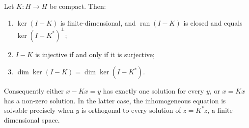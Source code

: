 \begin{theorem}\label{thm:fredholm}
Let $K:H\to H$ be compact. Then:
\begin{enumerate}
\item[(a)] $\ker(I-K)$ is finite-dimensional, and $\operatorname{ran}(I-K)$ is closed and equals $\ker(I-K^*)^\perp$;
\item[(b)] $I-K$ is injective if and only if it is surjective;
\item[(c)] $\dim\ker(I-K)=\dim\ker(I-K^*)$.
\end{enumerate}
Consequently either $x-Kx=y$ has exactly one solution for every $y$, or $x=Kx$ has a non-zero solution. In the latter case, the inhomogeneous equation is solvable precisely when $y$ is orthogonal to every solution of $z=K^*z$, a finite-dimensional space.
\end{theorem}
